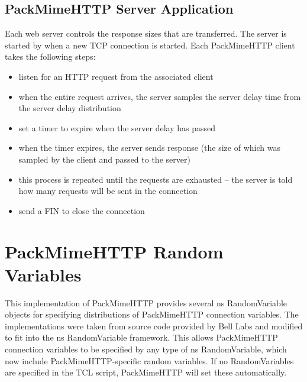 \subsection{PackMimeHTTP Server Application}

Each web server controls the response sizes that are transferred. The
server is started by when a new TCP connection is started. Each
PackMimeHTTP client takes the following steps: 
\begin{itemize}
\item{listen for an HTTP request from the associated client}
\item{when the entire request arrives, the server samples the server
delay time from the server delay distribution} 
\item{set a timer to expire when the server delay has passed}
\item{when the timer expires, the server sends response (the size of
  which was sampled by the client and passed to the server)}
\item{this process is repeated until the requests are exhausted -- the
server is told how many requests will be sent in the connection} 
\item{send a FIN to close the connection}
\end{itemize}

\section{PackMimeHTTP Random Variables}

This implementation of PackMimeHTTP provides several ns RandomVariable
objects for specifying distributions of PackMimeHTTP connection
variables. The implementations were taken from source code provided by
Bell Labs and modified to fit into the ns RandomVariable
framework. This allows PackMimeHTTP connection variables to be
specified by any type of ns RandomVariable, which now include
PackMimeHTTP-specific random variables. If no RandomVariables are
specified in the TCL script, PackMimeHTTP will set these
automatically.  

